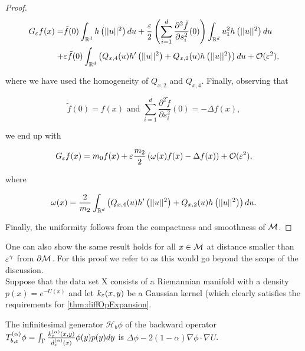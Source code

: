 \begin{proof}
\begin{equation*}\begin{aligned}
G_\varepsilon f(x)=&\tilde{f}(0)\int_{\mathbb{R}^d}h\left(||u||^2 \right)du + \frac{\varepsilon}{2}\left(\sum\limits_{i=1}^d \frac{\partial^2 \tilde{f}}{\partial s_i^2}(0) \right)\int_{\mathbb{R}^d}u_1^2 h\left(||u||^2\right)du \\
+&\varepsilon\tilde{f}(0)\int_{\mathbb{R}^d}\left(Q_{x,4}(u)h'\left(||u||^2\right) + Q_{x,2}(u)h\left(||u||^2\right)\right)du + \mathcal{O}(\varepsilon^2),
\end{aligned}\end{equation*}

where we have used the homogeneity of $Q_{x,2}$ and $Q_{x,4}$. Finally, observing that

\begin{equation*}
\tilde{f}(0) = f(x) \text{ and } \sum_{i=1}^d \frac{\partial^2 \tilde{f}}{\partial s_i^2}(0) = -\Delta f(x),
\end{equation*}

we end up with

\begin{equation*}
G_\varepsilon f(x)=m_0 f(x)+\varepsilon\frac{m_2}{2}\left(\omega(x)f(x)-\Delta f(x) \right)+\mathcal{O}(\varepsilon^2),
\end{equation*}

where

\begin{equation*}
\omega(x)=\frac{2}{m_2}\int_{\mathbb{R}^d}\left(Q_{x,4}(u)h'\left(||u||^2 \right) + Q_{x,2}(u)h\left(||u||^2 \right) \right)du.
\end{equation*}

Finally, the uniformity follows from the compactness and smoothness of $\mathcal{M}$.
\end{proof}

One can also show the same result holds for all $x\in\mathcal{M}$ at distance smaller than $\varepsilon^\gamma$ from $\partial\mathcal{M}$. For this proof we refer to \cite{Coifman20065} as this would go beyond the scope of the discussion.\\

Suppose that the data set X consists of a Riemannian manifold with a density $p(x) = e^{-U(x)}$ and let $k_\varepsilon(x, y)$ be a Gaussian kernel (which clearly satisfies the requirements for \ref{thm:diffOpExpansion}.

\begin{theorem}\label{thm:bFPO}
The infinitesimal generator $\mathcal{H}_b\phi$ of the backward operator $T_{b,\varepsilon}^{(\alpha)}\phi = \int_\Gamma \frac{k_\varepsilon^{(\alpha)}(x,y)}{d_\varepsilon^{(\alpha)}(x)} \phi(y)p(y)dy $ is $\Delta\phi - 2(1-\alpha)\nabla\phi\cdot\nabla U$.
\end{theorem}

